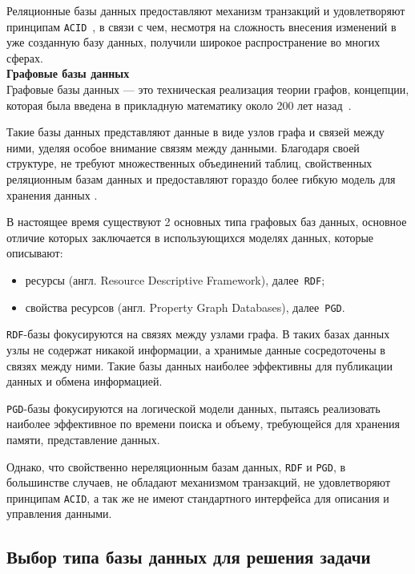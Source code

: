 Реляционные базы данных предоставляют механизм транзакций и удовлетворяют принципам \texttt{ACID}~\cite{acid}, в связи с чем, несмотря на сложность внесения изменений в уже созданную базу данных, получили широкое распространение во многих сферах.~\cite{modern-db-comparison}\\

\noindent\textbf{Графовые базы данных}\\

Графовые базы данных --- это техническая реализация теории графов, концепции, которая была введена в прикладную математику около 200 лет назад~\cite{graphdatabases}. 

Такие базы данных представляют данные в виде узлов графа и связей между ними, уделяя особое внимание связям между данными. Благодаря своей структуре, не требуют множественных объединений таблиц, свойственных реляционным базам данных и предоставляют гораздо более гибкую модель для хранения данных \cite{graphdatabases}.

В настоящее время существуют 2 основных типа графовых баз данных, основное отличие которых заключается в использующихся моделях данных, которые описывают:
\begin{itemize}
    \item ресурсы (англ. Resource Descriptive Framework), далее~\texttt{RDF};
    \item свойства ресурсов (англ. Property Graph Databases), далее~\texttt{PGD}.
\end{itemize}

\texttt{RDF}-базы фокусируются на связях между узлами графа. В таких базах данных узлы не содержат никакой информации, а хранимые данные сосредоточены в связях между ними. Такие базы данных наиболее эффективны для публикации данных и обмена информацией.~\cite{graph-vs-rel}

\texttt{PGD}-базы фокусируются на логической модели данных, пытаясь реализовать наиболее эффективное по времени поиска и объему, требующейся для хранения памяти, представление данных. \cite{graph-vs-rel}

Однако, что свойственно нереляционным базам данных, \texttt{RDF} и \texttt{PGD}, в большинстве случаев, не обладают механизмом транзакций, не удовлетворяют принципам \texttt{ACID}, а так же не имеют стандартного интерфейса для описания и управления данными.~\cite{rel-vs-nosql}

\subsection{Выбор типа базы данных для решения задачи}

